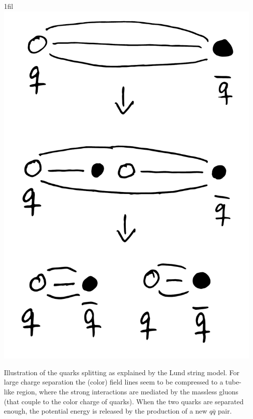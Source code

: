 \documentclass[a4paper, twoside, nobib]{tufte-book}
\makeatletter
\newcommand*{\centerfloat}{%
  \parindent \z@
  \leftskip \z@ \@plus 1fil \@minus \textwidth
  \rightskip\leftskip
  \parfillskip \z@skip}
\makeatother
\begin{document}
\begin{marginfigure}
  \centerfloat
  \includegraphics[width=0.99\textwidth]{figures/quark_splitting/quark_splitting.pdf}
  \caption[Quark splitting]{Illustration of the quarks splitting as explained by the Lund string model. For large charge separation the (color) field lines seem to be compressed to a tube-like region, where the strong interactions are mediated by the massless gluons (that couple to the color charge of quarks). When the two quarks are separated enough, the potential energy is released by the production of a new $q\bar{q}$ pair.}
  \label{fig:hep:quark_splitting_strings}
\end{marginfigure}
\end{document}
